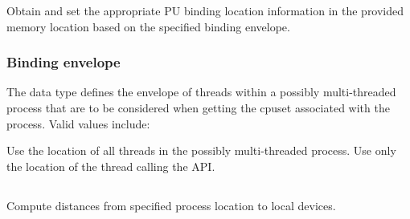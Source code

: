 \returnsimple

\descr

Obtain and set the appropriate \ac{PU} binding location information in the provided memory location based on the specified binding envelope.

\subsubsection{Binding envelope}
\label{api:proc:bindenv}

The  data type
defines the envelope of threads within a possibly multi-threaded process that are to be considered when getting the cpuset associated with the process. Valid values include:

\begin{constantdesc}
%
Use the location of all threads in the possibly multi-threaded process.
%
Use only the location of the thread calling the \ac{API}.
%
\end{constantdesc}


\subsection{}

\summary

Compute distances from specified process location to local devices.

\format


